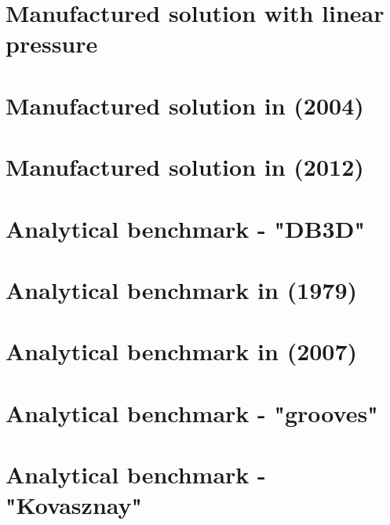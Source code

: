 \section{Manufactured solution with linear pressure \label{mms_plin}}


\section{Manufactured solution in \textcite{dobo04} (2004) \label{ss:mms2}}


\section{Manufactured solution in \textcite{tesk12} (2012) \label{ss:mms_tesk12}}


\section{Analytical benchmark \label{mms_db3D} - "DB3D"}


\section{Analytical benchmark in \textcite{been79} (1979) \label{mms4}}


\section{Analytical benchmark in \textcite{ilpe07} (2007) \label{mms6}}


\section{Analytical benchmark \label{mms7} - "grooves"}


\section{Analytical benchmark \label{mms8} - "Kovasznay"}


